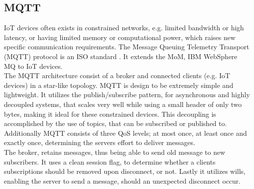 \subsection{MQTT}
IoT devices often exists in constrained networks, e.g. limited bandwidth or high latency, or having limited memory or computational power, which raises new specific communication requirements. The Message Queuing Telemetry Transport (MQTT) protocol is an ISO standard \cite{developing_standards_2016}. It extends the MoM, IBM WebSphere MQ to IoT devices.\\

The MQTT architecture consist of a broker and connected clients (e.g. IoT devices) in a star-like topology. MQTT is design to be extremely simple and lightweight. It utilizes the publish/subscribe pattern, for asynchronous and highly decoupled systems, that scales very well while using a small header of only two bytes, making it ideal for these constrained devices. This decoupling is accomplished by the use of topics, that can be subscribed or published to. Additionally MQTT consists of three QoS levels; at most once, at least once and exactly once, determining the servers effort to deliver messages.\\

The broker, retains messages, thus being able to send old message to new subscribers. It uses a clean session flag, to determine whether a clients subscriptions should be removed upon disconnect, or not. Lastly it utilizes wills, enabling the server to send a message, should an unexpected disconnect occur.

